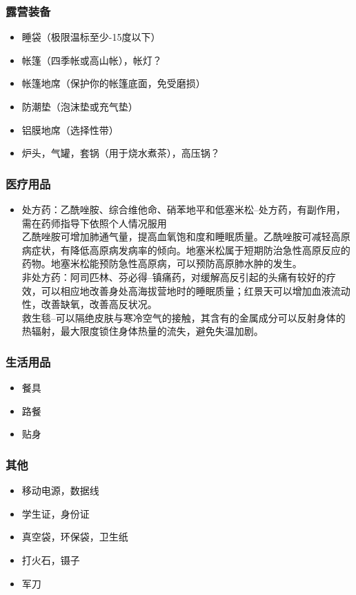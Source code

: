 \subsubsection{露营装备}
\begin{itemize}
  \item 睡袋（极限温标至少-15度以下）
  \item 帐篷（四季帐或高山帐），帐灯？
  \item 帐篷地席（保护你的帐篷底面，免受磨损）
  \item 防潮垫（泡沫垫或充气垫）
  \item 铝膜地席（选择性带）
  \item 炉头，气罐，套锅（用于烧水煮茶），高压锅？
\end{itemize}
\subsubsection{医疗用品}
\begin{itemize}
  \item 处方药：乙酰唑胺、综合维他命、硝苯地平和低塞米松--处方药，有副作用，需在药师指导下依照个人情况服用\\
        乙酰唑胺可增加肺通气量，提高血氧饱和度和睡眠质量。乙酰唑胺可减轻高原病症状，有降低高原病发病率的倾向。地塞米松属于短期防治急性高原反应的药物。地塞米松能预防急性高原病，可以预防高原肺水肿的发生。\\
        非处方药：阿司匹林、芬必得--镇痛药，对缓解高反引起的头痛有较好的疗效，可以相应地改善身处高海拔营地时的睡眠质量；红景天可以增加血液流动性，改善缺氧，改善高反状况。\\
        救生毯--可以隔绝皮肤与寒冷空气的接触，其含有的金属成分可以反射身体的热辐射，最大限度锁住身体热量的流失，避免失温加剧。
\end{itemize}
\subsubsection{生活用品}
\begin{itemize}
  \item 餐具
  \item 路餐
  \item 贴身
\end{itemize}
\subsubsection{其他}
\begin{itemize}
  \item 移动电源，数据线
  \item 学生证，身份证
  \item 真空袋，环保袋，卫生纸
  \item 打火石，镊子
  \item 军刀
\end{itemize}

